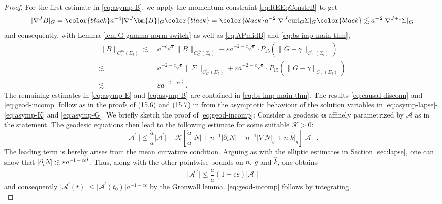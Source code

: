 \documentclass[11pt,leqno,textwidth=10cm]{amsart}
\numberwithin{equation}{section}
\theoremstyle{definition}
\theoremstyle{plain}
\newcommand{\1}{\mathbbm{1}}
\renewcommand{\epsilon}{\varepsilon}
\newcommand{\del}{\partial}
\newcommand{\curl}{\text{\normalfont{curl}}}
\newcommand{\curve}{\bm{\alpha}}
\newcommand{\RB}{\bm{B}}
\newcommand{\change}[1]{\color{black}#1\color{black}}
\begin{document}
\begin{proof}
\noindent For the first estimate in \eqref{eq:asymp-B}, we apply the momentum constraint \eqref{eq:REEqConstrB} to get
\[\lvert\nabla^J B\rvert_G=\change{a^{-4}\lvert\nabla^J \RB\rvert_G}= \change{a^{-2}\lvert\nabla^J\curl_G\Sigma\rvert_G}\lesssim a^{-2}\lvert\nabla^{J+1}\Sigma\rvert_G\]
and consequently, with Lemma \ref{lem:G-gamma-norm-switch} as well as \eqref{eq:APmidB} and \eqref{eq:bs-imp-main-thm},
\begin{align*}
\|B\|_{C^{15}_\gamma(\Sigma_t)}\lesssim&\,a^{-c\sqrt{\epsilon}}\|B\|_{C^{15}_G(\Sigma_t)}+\epsilon a^{-2-c\sqrt{\epsilon}}\cdot P_{{15}}(\|G-\gamma\|_{C^{15}_\gamma(\Sigma_t)})\\
\lesssim&\,a^{-2-c\sqrt{\epsilon}}\|\Sigma\|_{C^{16}_G(\Sigma_t)}+\epsilon a^{-2-c\sqrt{\epsilon}}\cdot P_{15}(\|G-\gamma\|_{C^{15}_\gamma(\Sigma_t)})\\
\lesssim&\,\epsilon a^{-2-c\epsilon^\frac18}\,.
\end{align*}
The remaining estimates in \eqref{eq:asymp-E} and \eqref{eq:asymp-B} are contained in \eqref{eq:bs-imp-main-thm}. The results \eqref{eq:causal-disconn} and \eqref{eq:geod-incomp} follow as in the proofs of (15.6) and (15.7) in \cite[Theorem 15.1]{Rodnianski2014} from the asymptotic behaviour of the solution variables in \eqref{eq:asymp-lapse}-\eqref{eq:asymp-K} and \eqref{eq:asymp-G}. \change{We briefly sketch the proof of \eqref{eq:geod-incomp}: Consider a geodesic $\curve$ affinely parametrized by $\mathcal{A}$ as in the statement. The geodesic equations then lead to the following estimate for some suitable $\mathcal{K}>0$:
\[\lvert \mathcal{A}^{\prime\prime}\rvert\leq \frac{\dot{a}}a\lvert\mathcal{A}^\prime\rvert+\mathcal{K}\left[\frac{\dot{a}}a\lvert N\rvert+n^{-1}\lvert\del_tN\rvert+n^{-1}\lvert \nabla N\rvert_g+n\lvert\hat{k}\rvert_g\right]\lvert\mathcal{A}^\prime\rvert\,.\]
The leading term is hereby arises from the mean curvature condition. Arguing as with the elliptic estimates in Section \ref{sec:lapse}, one can show that $\lvert\del_tN\rvert\lesssim \epsilon a^{-1-c\epsilon^\frac18}$. Thus, along with the other pointwise bounds on $n$, $g$ and $\hat{k}$, one obtains
\[\lvert \mathcal{A}^{\prime\prime}\rvert\leq \frac{\dot{a}}a\left(1+c\epsilon\right)\lvert\mathcal{A}^\prime\rvert\]
and consequently $\lvert\mathcal{A}^\prime(t)\rvert\leq \lvert \mathcal{A}^\prime(t_0)\rvert a^{-1-c\epsilon}$ by the Gronwall lemma. \eqref{eq:geod-incomp} follows by integrating.\\}



\end{proof}
\end{document}
